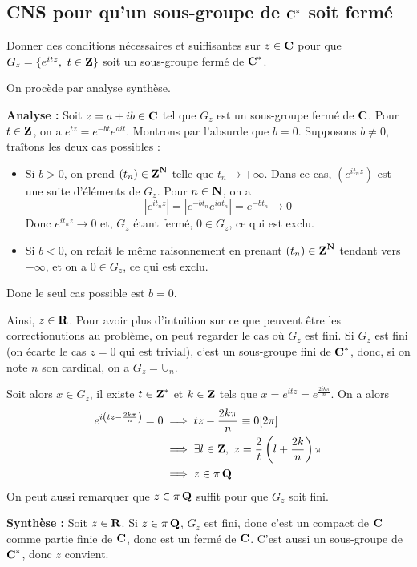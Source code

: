 \subsection{CNS pour qu'un sous-groupe de $\operatorname{\mathbf{C}}^*$ soit fermé}
\begin{exercice}
    Donner des conditions nécessaires et suiffisantes 
    sur $z\in\operatorname{\mathbf{C}}$ pour que $G_z=\lbrace e^{itz},\ t\in\operatorname{\mathbf{Z}}\rbrace$
    soit un sous-groupe fermé de $\operatorname{\mathbf{C}}^*$.
\end{exercice}

\begin{correction}
On procède par analyse synthèse.


\textbf{Analyse :} Soit $z=a+ib\in\operatorname{\mathbf{C}}$ tel que $G_z$ est un sous-groupe fermé de $\operatorname{\mathbf{C}}$.
Pour $t\in\operatorname{\mathbf{Z}}$, on a $e^{tz}=e^{-bt}e^{ait}$. 
Montrons par l'absurde que $b=0$.
Supposons $b\neq 0$, traîtons les deux cas possibles : 
\begin{itemize}
	\item Si $b > 0$, on prend $(t_n)\in\operatorname{\mathbf{Z}}^{\operatorname{\mathbf{N}}}$ telle que $t_n\longrightarrow +\infty$. Dans ce cas, $(e^{it_nz})$ est une suite d'éléments de $G_z$. Pour $n\in\operatorname{\mathbf{N}}$, on a \[|e^{it_nz}|=|e^{-bt_n}e^{iat_n}|=e^{-bt_n}\longrightarrow 0\]
	Donc $e^{it_nz}\longrightarrow 0$ et, $G_z$ étant fermé, $0\in G_z$, ce qui est exclu.
	\item Si $b < 0$, on refait le même raisonnement en prenant $(t_n)\in\operatorname{\mathbf{Z}}^{\operatorname{\mathbf{N}}}$ tendant vers $-\infty$, et on a $0\in G_z$, ce qui est exclu.
\end{itemize}
Donc le seul cas possible est $b=0$.


Ainsi, $z\in\operatorname{\mathbf{R}}$. Pour avoir plus d'intuition sur ce que peuvent être les correctionutions au problème, on peut regarder le cas où $G_z$ est fini. Si $G_z$ est fini (on écarte le cas $z=0$ qui est trivial), c'est un sous-groupe fini de $\operatorname{\mathbf{C}}^*$, donc, si on note $n$ son cardinal, on a $G_z=\mathbb U_n$.

Soit alors $x\in G_z$, il existe $t\in\operatorname{\mathbf{Z}}^*$ et $k\in\operatorname{\mathbf{Z}}$ tels que $x=e^{itz}=e^{\frac{2ik\pi}n}$. On a alors 
\begin{align*}
	e^{i\left(tz-\frac{2k\pi}n\right)} = 0 &\implies tz - \frac{2k\pi}n\equiv 0[2\pi]\\
										   &\implies \exists l\in\operatorname{\mathbf{Z}},\ z=\frac2t\left(l+\frac{2k}n\right)\pi\\
										   &\implies z\in\pi\operatorname{\mathbf{Q}}
\end{align*}
On peut aussi remarquer que $z\in\pi\operatorname{\mathbf{Q}}$ suffit pour que $G_z$ soit fini. 


\textbf{Synthèse :} Soit $z\in\operatorname{\mathbf{R}}$. Si $z\in\pi\operatorname{\mathbf{Q}}$, $G_z$ est fini, donc c'est un compact de $\operatorname{\mathbf{C}}$ comme partie finie de $\operatorname{\mathbf{C}}$, donc est un fermé de $\operatorname{\mathbf{C}}$. C'est aussi un sous-groupe de $\operatorname{\mathbf{C}}^*$, donc $z$ convient.



\end{correction}
